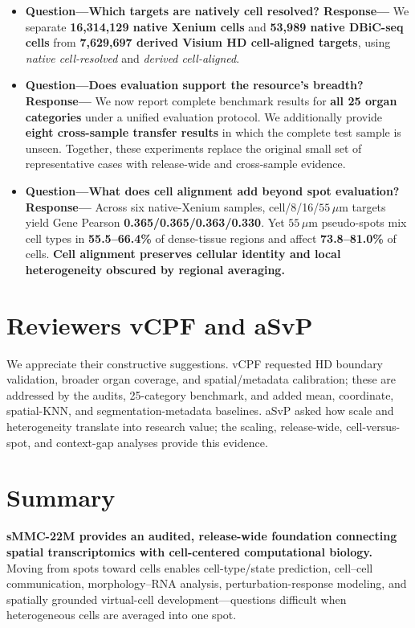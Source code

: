 \documentclass[10pt]{article}
\begin{document}
\begin{itemize}
\item \textbf{Question---Which targets are natively cell resolved? Response---}
We separate \textbf{16,314,129 native Xenium cells} and \textbf{53,989 native
DBiC-seq cells} from \textbf{7,629,697 derived Visium HD cell-aligned targets},
using \textit{native cell-resolved} and \textit{derived cell-aligned}.

\item \textbf{Question---Does evaluation support the resource's breadth?
Response---}
We now report complete benchmark results for \textbf{all 25 organ categories}
under a unified evaluation protocol. We additionally provide \textbf{eight
cross-sample transfer results} in which the complete test sample is unseen.
Together, these experiments replace the original small set of representative
cases with release-wide and cross-sample evidence.

\item \textbf{Question---What does cell alignment add beyond spot evaluation?
Response---}
Across six native-Xenium samples, cell/8/16/\(55\,\mu\mathrm{m}\) targets
yield Gene Pearson \textbf{0.365/0.365/0.363/0.330}. Yet
\(55\,\mu\mathrm{m}\) pseudo-spots mix cell types in \textbf{55.5--66.4\%}
of dense-tissue regions and affect \textbf{73.8--81.0\%} of cells.
\textbf{Cell alignment preserves cellular identity and local heterogeneity
obscured by regional averaging.}
\end{itemize}

\section*{Reviewers vCPF and aSvP}

We appreciate their constructive suggestions. vCPF requested HD boundary
validation, broader organ coverage, and spatial/metadata calibration; these
are addressed by the audits, 25-category benchmark, and added mean,
coordinate, spatial-KNN, and segmentation-metadata baselines. aSvP asked how
scale and heterogeneity translate into research value; the scaling,
release-wide, cell-versus-spot, and context-gap analyses provide this evidence.

\section*{Summary}

\textbf{sMMC-22M provides an audited, release-wide foundation connecting
spatial transcriptomics with cell-centered computational biology.} Moving
from spots toward cells enables cell-type/state prediction, cell--cell
communication, morphology--RNA analysis, perturbation-response modeling, and
spatially grounded virtual-cell development---questions difficult when
heterogeneous cells are averaged into one spot.
\end{document}

